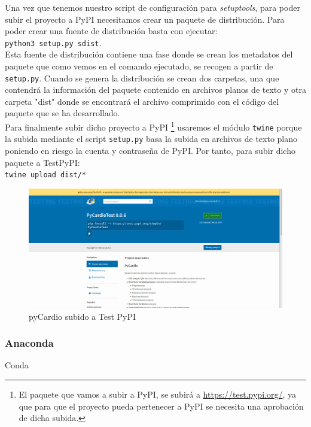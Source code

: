 Una vez que tenemos nuestro script de configuración para \textit{setuptools}, para poder subir el proyecto a PyPI necesitamos crear un paquete de distribución. Para poder crear una fuente de distribución basta con ejecutar: \\
\texttt{python3 setup.py sdist}. \\
Esta fuente de distribución contiene una fase donde se crean los metadatos del paquete que como vemos en el comando ejecutado, se recogen a partir de \texttt{setup.py}. Cuando se genera la distribución  se crean dos carpetas, una que contendrá la información del paquete contenido en archivos planos de texto y otra carpeta "dist" donde se encontrará el archivo comprimido con el código del paquete que se ha desarrollado. \\

Para finalmente subir dicho proyecto a PyPI \footnote{El paquete que vamos a subir a PyPI, se subirá  a \url{https://test.pypi.org/}, ya que para que el proyecto pueda pertenecer a PyPI se necesita una aprobación de dicha subida.} usaremos el módulo \texttt{twine} porque la subida mediante el script \texttt{setup.py} basa la subida en archivos de texto plano poniendo en riesgo la cuenta y contraseña de PyPI. Por tanto, para subir dicho paquete a TestPyPI: \\
\texttt{twine upload dist/*}

\begin{figure}[H]
    \centering
    \includegraphics[scale=0.3]{img/testPyPi.png}
    \caption{pyCardio subido a Test PyPI}
    \label{fig:testPypi}
\end{figure}

\subsubsection*{Anaconda}
Conda

